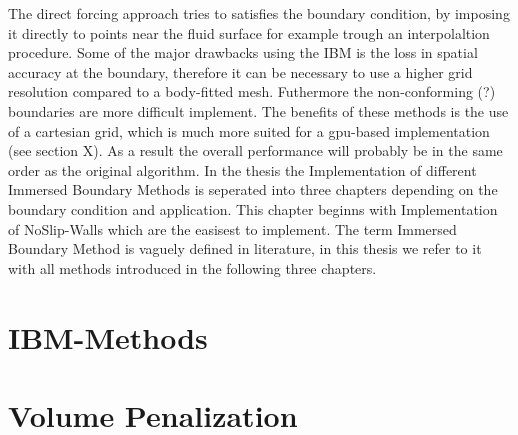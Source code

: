 The direct forcing approach tries to satisfies the boundary condition, by imposing it directly to points near the fluid surface for example
trough an interpolaltion procedure.
Some of the major drawbacks using the IBM is the loss in  spatial accuracy at the boundary, therefore it can be necessary to use a higher grid resolution
compared to a body-fitted mesh.  Futhermore the non-conforming (?) boundaries are more difficult implement.
The benefits of these methods is the use of a cartesian grid, which is much more suited for a gpu-based implementation (see section X).
As a result the overall performance will probably be in the same order as the original algorithm.
In the thesis the Implementation of different Immersed Boundary Methods is seperated into three chapters depending on the boundary condition and application.
This chapter beginns with Implementation of NoSlip-Walls which are the easisest to implement.
The term Immersed Boundary Method is vaguely defined in literature, in this thesis we refer to it with all methods introduced in the following three chapters.

\newpage

\section{IBM-Methods}
\section{Volume Penalization}

